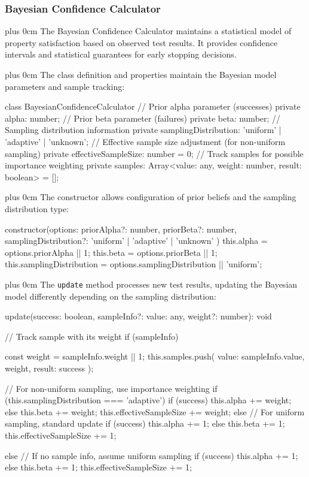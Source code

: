 \documentclass[11pt,a4paper]{article}
\newcommand{\justifytext}{\leftskip=0pt \rightskip=0pt plus 0cm}
\begin{document}
\subsubsection{Bayesian Confidence Calculator}

\justifytext
The Bayesian Confidence Calculator maintains a statistical model of property satisfaction based on observed test results. It provides confidence intervals and statistical guarantees for early stopping decisions.

\justifytext
The class definition and properties maintain the Bayesian model parameters and sample tracking:

\begin{wrappedcode}
class BayesianConfidenceCalculator {
  // Prior alpha parameter (successes)
  private alpha: number;
  // Prior beta parameter (failures)
  private beta: number;
  // Sampling distribution information
  private samplingDistribution: 'uniform' | 'adaptive' | 'unknown';
  // Effective sample size adjustment (for non-uniform sampling)
  private effectiveSampleSize: number = 0;
  // Track samples for possible importance weighting
  private samples: Array<{value: any, weight: number, result: boolean}> = [];
}
\end{wrappedcode}

\justifytext
The constructor allows configuration of prior beliefs and the sampling distribution type:

\begin{wrappedcode}
  constructor(options: {
    priorAlpha?: number, 
    priorBeta?: number,
    samplingDistribution?: 'uniform' | 'adaptive' | 'unknown'
  }) {
    this.alpha = options.priorAlpha || 1;
    this.beta = options.priorBeta || 1;
    this.samplingDistribution = options.samplingDistribution || 'uniform';
  }
\end{wrappedcode}

\justifytext
The \texttt{update} method processes new test results, updating the Bayesian model differently depending on the sampling distribution:

\begin{wrappedcode}
  update(success: boolean, sampleInfo?: {value: any, weight?: number}): void {
    // Track sample with its weight
    if (sampleInfo) {
      const weight = sampleInfo.weight || 1;
      this.samples.push({
        value: sampleInfo.value,
        weight,
        result: success
      });
      
      // For non-uniform sampling, use importance weighting
      if (this.samplingDistribution === 'adaptive') {
        if (success) {
          this.alpha += weight;
        } else {
          this.beta += weight;
        }
        this.effectiveSampleSize += weight;
      } else {
        // For uniform sampling, standard update
        if (success) {
          this.alpha += 1;
        } else {
          this.beta += 1;
        }
        this.effectiveSampleSize += 1;
      }
    } else {
      // If no sample info, assume uniform sampling
      if (success) {
        this.alpha += 1;
      } else {
        this.beta += 1;
      }
      this.effectiveSampleSize += 1;
    }
  }
\end{wrappedcode}
\end{document}
